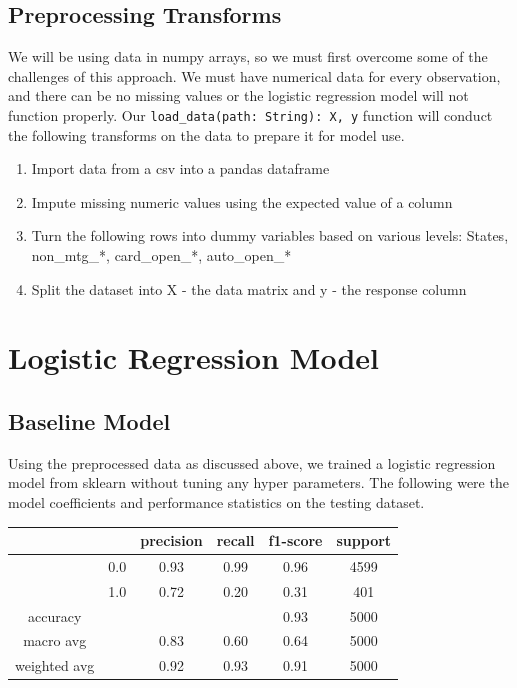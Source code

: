 \documentclass[12pt]{article}
\begin{document}
	\subsection{Preprocessing Transforms}
	
	We will be using data in numpy arrays, so we must first overcome some of the challenges of this approach. We must have numerical data for every observation, and there can be no missing values or the logistic regression model will not function properly. Our \verb|load_data(path: String): X, y| function will conduct the following transforms on the data to prepare it for model use. 
	
	\begin{enumerate}
		\item Import data from a csv into a pandas dataframe
		\item Impute missing numeric values using the expected value of a column
		\item Turn the following rows into dummy variables based on various levels: States, non\_mtg\_*, card\_open\_*, auto\_open\_*
		\item Split the dataset into X - the data matrix and y - the response column
	\end{enumerate}
	
	\section{Logistic Regression Model}
	
	\subsection{Baseline Model}
	
	Using the preprocessed data as discussed above, we trained a logistic regression model from sklearn without tuning any hyper parameters. 
	The following were the model coefficients and performance statistics on the testing dataset. 
	

	\begin{tabular}{c|c|c|c|c|c}
	\hline
			& 		& 	precision &  recall  & f1-score   & support \\ \hline
			
			&  0.0	  &		0.93 &     0.99   &  0.96    &  4599 \\ \hline
			&  1.0    &		0.72 &     0.20   &   0.31   &    401 \\ \hline
			
			accuracy & & & &                       					0.93     & 5000 \\ \hline
			macro avg  & &   				0.83   &   0.60  &    0.64  &    5000  \\ \hline
			weighted avg  & &   			0.92   &   0.93  &    0.91   &   5000 \\ \hline
	\end{tabular}					
\end{document}
